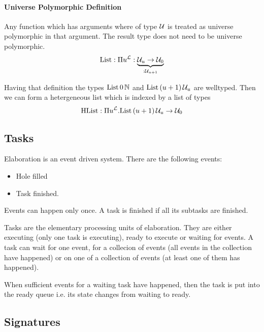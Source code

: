 \paragraph{Universe Polymorphic Definition}

Any function which has arguments where of type ${\cal U}$ is treated as universe
polymorphic in that argument. The result type does not need to be universe
polymorphic.
$$
\text{List}: \Pi u^{\cal L}: \underbrace{{\cal U}_u \to {\cal U}_0}_{: {\cal U}_{u+1}}
$$

Having that definition the types $\text{List}\, 0\, {\mathbb N}$ and $\text{List}\,
(u+1)\, {\cal U}_u$ are welltyped. Then we can form a hetergeneous list which is
indexed by a list of types
$$
    \text{HList}: \Pi u^{\cal L}. \text{List}\, (u+1)\, {\cal U}_u \to {\cal U}_0
$$




\subsection{Tasks}

Elaboration is an event driven system. There are the following events:

\begin{itemize}
    \item Hole filled
    \item Task finished.
\end{itemize}

Events can happen only once. A task is finished if all its subtasks are
finished.

Tasks are the elementary processing units of elaboration. They are either
executing (only one task is executing), ready to execute or waiting for events.
A task can wait for one event, for a collecion of events (all events in the
collection have happened) or on one of a collection of events (at least one of
them has happened).

When sufficient events for a waiting task have happened, then the task is put
into the ready queue i.e. its state changes from waiting to ready.





\subsection{Signatures}

